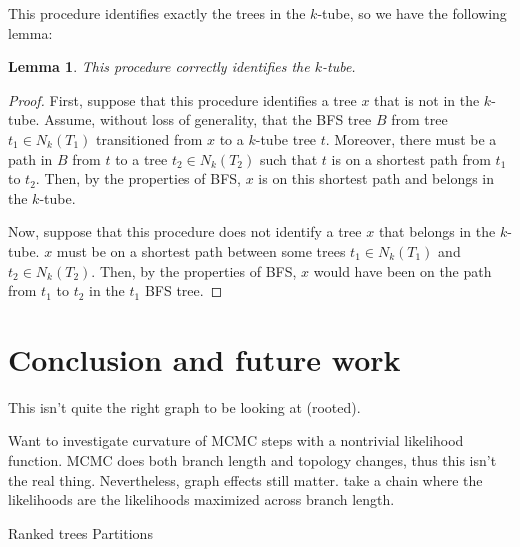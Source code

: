 \documentclass{amsart}
\newtheorem{lemma}[theorem]{Lemma}
\begin{document}
This procedure identifies exactly the trees in the $k$-tube, so we have the following lemma:
\begin{lemma}
	\label{lem:k_tube_correctness}
	This procedure correctly identifies the $k$-tube.
\end{lemma}
\begin{proof}
	First, suppose that this procedure identifies a tree $x$ that is not in the $k$-tube.
	Assume, without loss of generality, that the BFS tree $B$ from tree $t_1 \in N_k(T_1)$ transitioned from $x$ to a $k$-tube tree $t$.
	Moreover, there must be a path in $B$ from $t$ to a tree $t_2 \in N_k(T_2)$ such that $t$ is on a shortest path from $t_1$ to $t_2$.
	Then, by the properties of BFS, $x$ is on this shortest path and belongs in the $k$-tube.

	Now, suppose that this procedure does not identify a tree $x$ that belongs in the $k$-tube.
	$x$ must be on a shortest path between some trees $t_1 \in N_k(T_1)$ and $t_2 \in N_k(T_2)$.
	Then, by the properties of BFS, $x$ would have been on the path from $t_1$ to $t_2$ in the $t_1$ BFS tree.
\end{proof}

\section{Conclusion and future work}
This isn't quite the right graph to be looking at (rooted).

Want to investigate curvature of MCMC steps with a nontrivial likelihood function.
MCMC does both branch length and topology changes, thus this isn't the real thing.
Nevertheless, graph effects still matter.
\cite{Stefankovic2011-hu} take a chain where the likelihoods are the likelihoods maximized across branch length.

Ranked trees \cite{Song2006-xe}
Partitions \cite{Gusfield2002-il}





\end{document}
